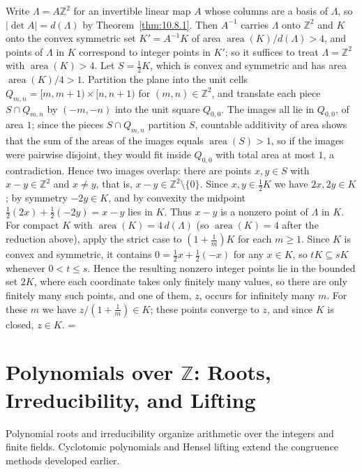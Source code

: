 \documentclass[11pt]{article}
\makeatletter
\let\nt@closedisplay\]
\def\nt@guardedclose{\@ifnextchar\par{\nt@closeafterpar}{\@ifnextchar\end{\postdisplaypenalty\@M\nt@closedisplay}{\nt@closedisplay}}}
\def\nt@closeafterpar\par{\@ifnextchar\par{\nt@closeafterpar}{\@ifnextchar\end{\postdisplaypenalty\@M\nt@closedisplay\par}{\nt@closedisplay\par}}}
\renewenvironment{proof}[1][\proofname]{\par
  \pushQED{\qed}\normalfont\topsep\medskipamount\edef\nt@afterproof{\@endparpenalty=\the\@endparpenalty\relax}\@beginparpenalty\@M\@endparpenalty\@M\let\]\nt@guardedclose\trivlist\item[]\textit{#1\@addpunct{.}} \ignorespaces}{\ifvmode\addpenalty\@M\fi\popQED\nt@afterproof\endtrivlist\@endpefalse}
\theoremstyle{ntstyle}
\DeclareMathOperator{\area}{area}
\makeatother
\begin{document}
\begin{proof} Write $\Lambda=A\mathbb{Z}^2$ for an
  invertible linear map $A$ whose columns are a basis of $\Lambda$, so
  $|\det A|=d(\Lambda)$ by Theorem~\ref{thm:10.8.1}. Then $A^{-1}$ carries $\Lambda$ onto
  $\mathbb{Z}^2$ and $K$ onto the convex symmetric set $K'=A^{-1}K$ of
  area $\area(K)/d(\Lambda)>4$, and points of $\Lambda$
  in $K$ correspond to integer points in $K'$; so it suffices to treat
  $\Lambda=\mathbb{Z}^2$ with $\area(K)>4$. Let
  $S=\tfrac{1}{2}K$, which is convex and symmetric and has area
  $\area(K)/4>1$. Partition the plane into the unit cells
  $Q_{m,n}=[m,m+1)\times[n,n+1)$ for $(m,n)\in\mathbb{Z}^2$, and
  translate each piece $S\cap Q_{m,n}$ by $(-m,-n)$ into the unit
  square $Q_{0,0}$. The images all lie in $Q_{0,0}$, of area $1$; since the pieces $S\cap Q_{m,n}$ partition $S$,
  countable additivity of area shows that the sum of the areas of the images equals $\area(S)>1$, so if the images
  were pairwise disjoint, they would fit inside $Q_{0,0}$ with total area at most $1$, a contradiction. Hence two
  images overlap:
  there are points $x,y\in S$ with $x-y\in\mathbb{Z}^2$ and $x\neq y$,
  that is, $x-y\in\mathbb{Z}^2\setminus\{0\}$. Since $x,y\in\tfrac{1}{2}K$ we
  have $2x,2y\in K$; by symmetry $-2y\in K$, and by convexity the
  midpoint $\tfrac{1}{2}(2x)+\tfrac{1}{2}(-2y)=x-y$ lies in $K$. Thus $x-y$ is
  a nonzero point of $\Lambda$ in $K$. For compact $K$ with
  $\area(K)=4\,d(\Lambda)$ (so $\area(K)=4$ after the reduction above), apply the strict case to
  $(1+\tfrac{1}{m})K$ for each $m\ge1$. Since $K$ is convex and symmetric,
  it contains $0=\tfrac12x+\tfrac12(-x)$ for any $x\in K$, so $tK\subseteq sK$
  whenever $0<t\le s$. Hence the resulting nonzero integer points lie in the
  bounded set $2K$, where each coordinate takes only finitely many values,
  so there are only finitely many such points, and one of them, $z$, occurs for infinitely
  many $m$. For these $m$ we have $z/(1+\tfrac{1}{m})\in K$; these points
  converge to $z$, and since $K$ is closed, $z\in K$.
\end{proof}
\newpage


\section{Polynomials over \texorpdfstring{$\mathbb{Z}$}{Z}: Roots, Irreducibility, and Lifting}

Polynomial roots and irreducibility organize arithmetic over the integers and finite fields. Cyclotomic polynomials
and Hensel lifting extend the congruence methods developed earlier.
\end{document}
